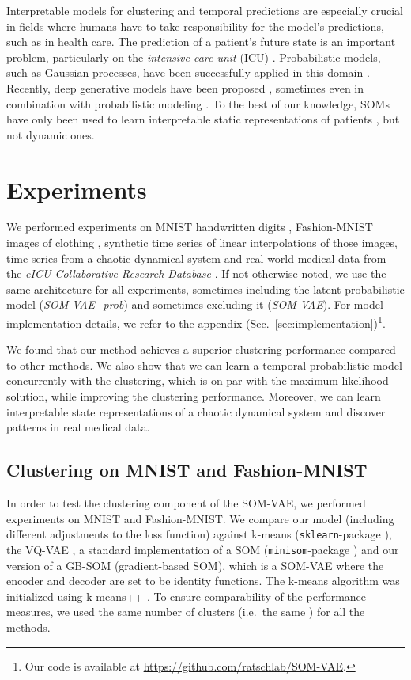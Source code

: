 \documentclass{article}
\begin{document}
Interpretable models for clustering and temporal predictions are especially crucial in fields where humans have to take responsibility for the model's predictions, such as in health care.
The prediction of a patient's future state is an important problem, particularly on the \emph{intensive care unit} (ICU) \citep{Harutyunyan2017, Badawi2018}.
Probabilistic models, such as Gaussian processes, have been successfully applied in this domain \citep{Colopy2016, Schulam2016}.
Recently, deep generative models have been proposed \citep{Hyland2017}, sometimes even in combination with probabilistic modeling \citep{Lim2018}.
To the best of our knowledge, SOMs have only been used to learn interpretable static representations of patients \citep{Tirunagari2015}, but not dynamic ones. 
\section{Experiments}\label{sec:experiments}

We performed experiments on MNIST handwritten digits \citep{LeCun1998}, Fashion-MNIST images of clothing \citep{Xiao2017}, synthetic time series of linear interpolations of those images, time series from a chaotic dynamical system and real world medical data from the \emph{eICU Collaborative Research Database} \citep{Goldberger2000}.
If not otherwise noted, we use the same architecture for all experiments, sometimes including the latent probabilistic model (\emph{SOM-VAE\_prob}) and sometimes excluding it (\emph{SOM-VAE}).
For model implementation details, we refer to the appendix (Sec.~\ref{sec:implementation})\footnote{Our code is available at \url{https://github.com/ratschlab/SOM-VAE}.}.

We found that our method achieves a superior clustering performance compared to other methods.
We also show that we can learn a temporal probabilistic model concurrently with the clustering, which is on par with the maximum likelihood solution, while improving the clustering performance.
Moreover, we can learn interpretable state representations of a chaotic dynamical system and discover patterns in real medical data.


\subsection{Clustering on MNIST and Fashion-MNIST}\label{sec:clustering_benchmark}

In order to test the clustering component of the SOM-VAE, we performed experiments on MNIST and Fashion-MNIST.
We compare our model (including different adjustments to the loss function) against k-means \citep{Lloyd1982} (\texttt{sklearn}-package \citep{Pedregosa2011}), the VQ-VAE \citep{Oord2017}, a standard implementation of a SOM (\texttt{minisom}-package \citep{Vettigli2017}) and our version of a GB-SOM (gradient-based SOM), which is a SOM-VAE where the encoder and decoder are set to be identity functions.
The k-means algorithm was initialized using k-means++ \citep{Arthur2007-rk}.
To ensure comparability of the performance measures, we used the same number of clusters (i.e.\ the same ) for all the methods.
\end{document}
